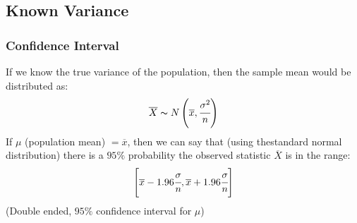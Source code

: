 \documentclass{report}
\begin{document}
        \subsection*{Known Variance}
            \subsubsection*{Confidence Interval}
                If we know the true variance of the population, then the sample mean would be distributed as:
                \[\overline{X} \thicksim N\left(\overline{x}, \cfrac{\sigma^2}{n} \right)\]
                If $\mu$ (population mean) $= \overline{x}$, then we can say that (using thestandard normal distribution) there is a $95\%$ probability the observed statistic $\overline{X}$ is in the range:
                \[\left[\overline{x} - 1.96\cfrac{\sigma}{n}, \overline{x} + 1.96\cfrac{\sigma}{n} \right]\]
                (Double ended, $95\%$ confidence interval for $\mu$)
\end{document}

